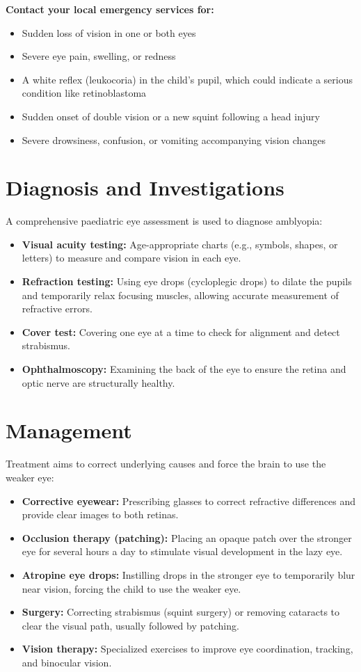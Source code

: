 \textbf{Contact your local emergency services for:}
\begin{itemize}
    \item Sudden loss of vision in one or both eyes
    \item Severe eye pain, swelling, or redness
    \item A white reflex (leukocoria) in the child's pupil, which could indicate a serious condition like retinoblastoma
    \item Sudden onset of double vision or a new squint following a head injury
    \item Severe drowsiness, confusion, or vomiting accompanying vision changes
\end{itemize}

\section*{Diagnosis and Investigations}
A comprehensive paediatric eye assessment is used to diagnose amblyopia:

\begin{itemize}
    \item \textbf{Visual acuity testing:} Age-appropriate charts (e.g., symbols, shapes, or letters) to measure and compare vision in each eye.
    \item \textbf{Refraction testing:} Using eye drops (cycloplegic drops) to dilate the pupils and temporarily relax focusing muscles, allowing accurate measurement of refractive errors.
    \item \textbf{Cover test:} Covering one eye at a time to check for alignment and detect strabismus.
    \item \textbf{Ophthalmoscopy:} Examining the back of the eye to ensure the retina and optic nerve are structurally healthy.
\end{itemize}

\section*{Management}
Treatment aims to correct underlying causes and force the brain to use the weaker eye:

\begin{itemize}
    \item \textbf{Corrective eyewear:} Prescribing glasses to correct refractive differences and provide clear images to both retinas.
    \item \textbf{Occlusion therapy (patching):} Placing an opaque patch over the stronger eye for several hours a day to stimulate visual development in the lazy eye.
    \item \textbf{Atropine eye drops:} Instilling drops in the stronger eye to temporarily blur near vision, forcing the child to use the weaker eye.
    \item \textbf{Surgery:} Correcting strabismus (squint surgery) or removing cataracts to clear the visual path, usually followed by patching.
    \item \textbf{Vision therapy:} Specialized exercises to improve eye coordination, tracking, and binocular vision.
\end{itemize}

